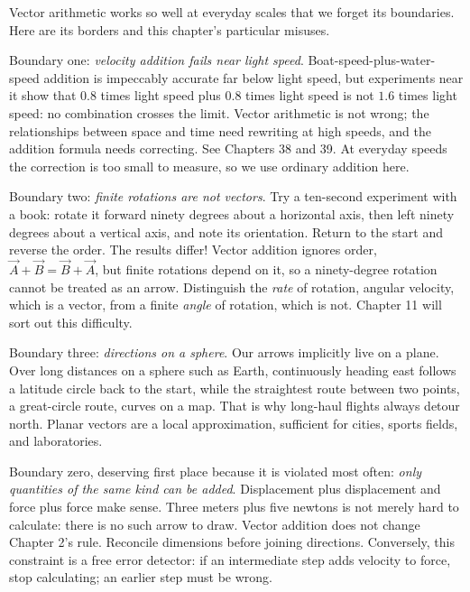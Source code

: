 \begin{mainline}
Vector arithmetic works so well at everyday scales that we forget its boundaries. Here are its borders and this chapter's particular misuses.

Boundary one: \emph{velocity addition fails near light speed}. Boat-speed-plus-water-speed addition is impeccably accurate far below light speed, but experiments near it show that \(0.8\) times light speed plus \(0.8\) times light speed is not \(1.6\) times light speed: no combination crosses the limit. Vector arithmetic is not wrong; the relationships between space and time need rewriting at high speeds, and the addition formula needs correcting. See Chapters 38 and 39. At everyday speeds the correction is too small to measure, so we use ordinary addition here.

Boundary two: \emph{finite rotations are not vectors}. Try a ten-second experiment with a book: rotate it forward ninety degrees about a horizontal axis, then left ninety degrees about a vertical axis, and note its orientation. Return to the start and reverse the order. The results differ! Vector addition ignores order, \(\vec A+\vec B=\vec B+\vec A\), but finite rotations depend on it, so a ninety-degree rotation cannot be treated as an arrow. Distinguish the \emph{rate} of rotation, angular velocity, which is a vector, from a finite \emph{angle} of rotation, which is not. Chapter 11 will sort out this difficulty.

Boundary three: \emph{directions on a sphere}. Our arrows implicitly live on a plane. Over long distances on a sphere such as Earth, continuously heading east follows a latitude circle back to the start, while the straightest route between two points, a great-circle route, curves on a map. That is why long-haul flights always detour north. Planar vectors are a local approximation, sufficient for cities, sports fields, and laboratories.

Boundary zero, deserving first place because it is violated most often: \emph{only quantities of the same kind can be added}. Displacement plus displacement and force plus force make sense. Three meters plus five newtons is not merely hard to calculate: there is no such arrow to draw. Vector addition does not change Chapter 2's rule. Reconcile dimensions before joining directions. Conversely, this constraint is a free error detector: if an intermediate step adds velocity to force, stop calculating; an earlier step must be wrong.
\end{mainline}

